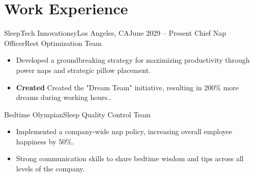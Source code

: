 \section{Work Experience}
  \resumeSubHeadingListStart

     \resumeSubheadingWork
      {SleepTech Innovationsy}{\hspace{-6em}Los Angeles, CA}{June 2029 -- Present}
      { Chief Nap Officer}{Rest Optimization Team}
      \begin{itemize}[label=\textbf{$\bullet$}]
        \setlength{\itemsep}{-0.15em} %
        \item{Developed a groundbreaking strategy for maximizing productivity through power naps and strategic pillow placement.}
        \item{\textbf{Created} Created the "Dream Team" initiative, resulting in 200\% more dreams during working hours..}
      \end{itemize}

      \vspace{-3.1em}

     \resumeSubheadingWork
      {}{}{}
      {Bedtime Olympian}{Sleep Quality Control Team}
      \begin{itemize}[label=\textbf{$\bullet$}]
        \setlength{\itemsep}{-0.15em} %
        \item{Implemented a company-wide nap policy, increasing overall employee happiness by 50\%.}
        \item{
          Strong communication skills to share bedtime wisdom and tips across all levels of the company.}
        \end{itemize}

